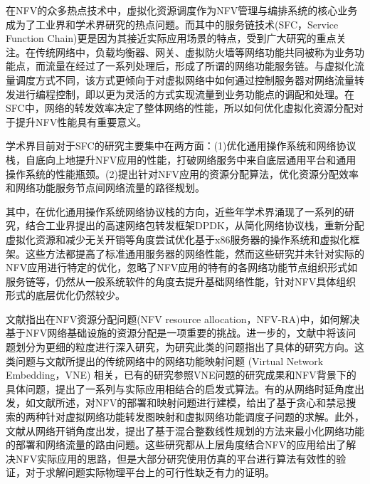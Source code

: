 
在NFV的众多热点技术中，虚拟化资源调度作为NFV管理与编排系统的核心业务成为了工业界和学术界研究的热点问题。而其中的服务链技术(SFC，Service Function Chain)更是因为其接近实际应用场景的特点，受到广大研究的重点关注\cite{zave2017dynamic,kulkarni2017nfvnice,mijumbi2016network}。在传统网络中，负载均衡器、网关、虚拟防火墙等网络功能共同被称为业务功能点，而流量在经过了一系列处理后，形成了所谓的网络功能服务链。与虚拟化流量调度方式不同，该方式更倾向于对虚拟网络中如何通过控制服务器对网络流量转发进行编程控制，即以更为灵活的方式实现流量到业务功能点的调配和处理。在SFC中，网络的转发效率决定了整体网络的性能，所以如何优化虚拟化资源分配对于提升NFV性能具有重要意义。
	
学术界目前对于SFC的研究主要集中在两方面：(1)优化通用操作系统和网络协议栈，自底向上地提升NFV应用的性能，打破网络服务中来自底层通用平台和通用操作系统的性能瓶颈。(2)提出针对NFV应用的资源分配算法，优化资源分配效率和网络功能服务节点间网络流量的路径规划。

其中，在优化通用操作系统网络协议栈的方向，近些年学术界涌现了一系列的研究\cite{rizzo2012netmap,ram2013hyper,belay2014ix,hwang2015netvm,yasukata2016stackmap,prekas2017zygos}，结合工业界提出的高速网络包转发框架DPDK\cite{intel2015data}，从简化网络协议栈，重新分配虚拟化资源和减少无关开销等角度尝试优化基于x86服务器的操作系统和虚拟化框架。这些方法都提高了标准通用服务器的网络性能，然而这些研究并未针对实际的NFV应用进行特定的优化，忽略了NFV应用的特有的各网络功能节点组织形式如服务链等，仍然从一般系统软件的角度去提升基础网络性能，针对NFV具体组织形式的底层优化仍然较少。

文献指出在NFV资源分配问题(NFV resource allocation，NFV-RA)中，如何解决基于NFV网络基础设施的资源分配是一项重要的挑战。进一步的，文献中将该问题划分为更细的粒度进行深入研究，为研究此类的问题指出了具体的研究方向。这类问题与文献所提出的传统网络中的网络功能映射问题 (Virtual Network Embedding，VNE) 相关，已有的研究参照VNE问题的研究成果和NFV背景下的具体问题，提出了一系列与实际应用相结合的启发式算法。有的从网络时延角度出发，如文献所述，对NFV的部署和映射问题进行建模，给出了基于贪心和禁忌搜索的两种针对虚拟网络功能转发图映射和虚拟网络功能调度子问题的求解。此外，文献从网络开销角度出发，提出了基于混合整数线性规划的方法来最小化网络功能的部署和网络流量的路由问题。这些研究都从上层角度结合NFV的应用给出了解决NFV实际应用的思路，但是大部分研究使用仿真的平台进行算法有效性的验证，对于求解问题实际物理平台上的可行性缺乏有力的证明。


